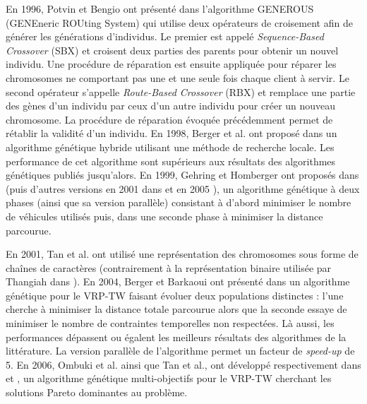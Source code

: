 En 1996, Potvin et Bengio ont présenté dans \cite{Potvin1996} l'algorithme GENEROUS (GENEneric ROUting System) qui utilise deux opérateurs de croisement afin de générer les générations d'individus. Le premier est appelé \textit{Sequence-Based Crossover} (SBX) et croisent deux parties des parents pour obtenir un nouvel individu. Une procédure de réparation est ensuite appliquée pour réparer les chromosomes ne comportant pas une et une seule fois chaque client à servir. Le second opérateur s'appelle \textit{Route-Based Crossover} (RBX) et remplace une partie des gènes d'un individu par ceux d'un autre individu pour créer un nouveau chromosome. La procédure de réparation évoquée précédemment permet de rétablir la validité d'un individu.
En 1998, Berger et al. ont proposé dans \cite{Berger1998} un algorithme génétique hybride utilisant une méthode de recherche locale. Les performance de cet algorithme sont supérieurs aux résultats des algorithmes génétiques publiés jusqu'alors.
En 1999, Gehring et Homberger ont proposés dans \cite{Gehring1999,Homberger1999} (puis d'autres versions en 2001 dans \cite{Gehring2001} et en 2005 \cite{Homberger2005}), un algorithme génétique à deux phases (ainsi que sa version parallèle) consistant à d'abord minimiser le nombre de véhicules utilisés puis, dans une seconde phase à minimiser la distance parcourue.

En 2001, Tan et al. ont utilisé une représentation des chromosomes sous forme de chaînes de caractères (contrairement à la représentation binaire utilisée par Thangiah dans \cite{Thangiah1991}).
En 2004, Berger et Barkaoui ont présenté dans \cite{Berger2004} un algorithme génétique pour le VRP-TW faisant évoluer deux populations distinctes : l'une cherche à minimiser la distance totale parcourue alors que la seconde essaye de minimiser le nombre de contraintes temporelles non respectées. Là aussi, les performances dépassent ou égalent les meilleurs résultats des algorithmes de la littérature. La version parallèle de l'algorithme permet un facteur de \textit{speed-up} de 5.
En 2006, Ombuki et al. ainsi que Tan et al., ont développé respectivement dans \cite{Ombuki2006} et \cite{Tan2006}, un algorithme génétique multi-objectifs pour le VRP-TW cherchant les solutions Pareto dominantes au problème.
\\

